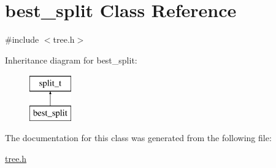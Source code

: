 \hypertarget{classbest__split}{\section{best\+\_\+split Class Reference}
\label{classbest__split}
}


{\ttfamily \#include $<$tree.\+h$>$}

Inheritance diagram for best\+\_\+split\+:\begin{figure}[H]
\begin{center}
\leavevmode
\includegraphics[height=2.000000cm]{classbest__split}
\end{center}
\end{figure}


The documentation for this class was generated from the following file\+:\begin{DoxyCompactItemize}
\item 
\hyperlink{tree_8h}{tree.\+h}\end{DoxyCompactItemize}
